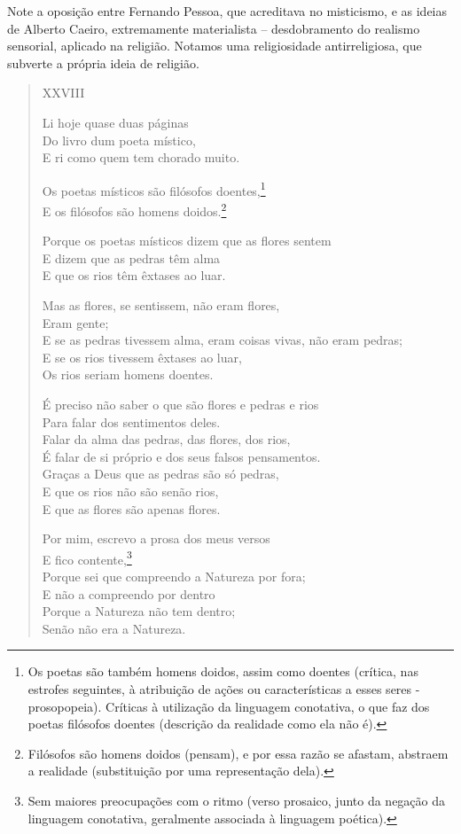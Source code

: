 Note a oposição entre Fernando Pessoa, que acreditava no misticismo, e as ideias de Alberto Caeiro, extremamente materialista -- desdobramento do realismo sensorial, aplicado na religião. Notamos uma religiosidade antirreligiosa, que subverte a própria ideia de religião.

\begin{verse}
XXVIII

Li hoje quase duas páginas \\
Do livro dum poeta místico, \\
E ri como quem tem chorado muito.

Os poetas místicos são filósofos doentes,\footnote{Os poetas são também homens doidos, assim como doentes (crítica, nas estrofes seguintes, à atribuição de ações ou características a esses seres - prosopopeia). Críticas à utilização da linguagem conotativa, o que faz dos poetas filósofos doentes (descrição da realidade como ela não é).} \\
E os filósofos são homens doidos.\footnote{Filósofos são homens doidos (pensam), e por essa razão se afastam, abstraem a realidade (substituição por uma representação dela).}

Porque os poetas místicos dizem que as flores sentem \\
E dizem que as pedras têm alma \\
E que os rios têm êxtases ao luar.

Mas as flores, se sentissem, não eram flores, \\
Eram gente; \\
E se as pedras tivessem alma, eram coisas vivas, não eram pedras; \\
E se os rios tivessem êxtases ao luar, \\
Os rios seriam homens doentes.

É preciso não saber o que são flores e pedras e rios \\
Para falar dos sentimentos deles. \\
Falar da alma das pedras, das flores, dos rios, \\
É falar de si próprio e dos seus falsos pensamentos. \\
Graças a Deus que as pedras são só pedras, \\
E que os rios não são senão rios, \\
E que as flores são apenas flores.

Por mim, escrevo a prosa dos meus versos \\
E fico contente,\footnote{Sem maiores preocupações com o ritmo (verso prosaico, junto da negação da linguagem conotativa, geralmente associada à linguagem poética).} \\
Porque sei que compreendo a Natureza por fora; \\
E não a compreendo por dentro \\
Porque a Natureza não tem dentro; \\
Senão não era a Natureza.
\end{verse}

